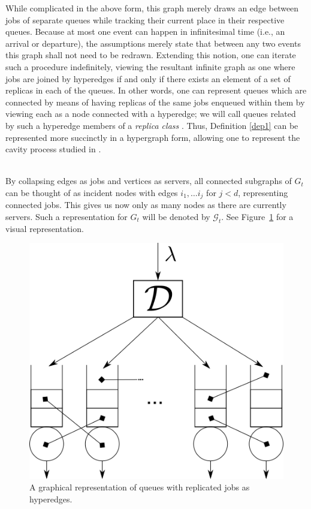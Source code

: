 While complicated in the above form, this graph merely draws an edge between jobs of separate queues while tracking their current place in their respective queues. Because at most one event can happen in infinitesimal time (i.e., an arrival or departure), the assumptions merely state that between any two events this graph shall not need to be redrawn. Extending this notion, one can iterate such a procedure indefinitely, viewing the resultant infinite graph as one where jobs are joined by hyperedges if and only if there exists an element of a set of replicas in each of the queues. In other words, one can represent queues which are connected by means of having replicas of the same jobs enqueued within them by viewing each as a node connected with a hyperedge; we will call queues related by such a hyperedge members of a \textit{replica class} . Thus, Definition \ref{dep1} can be represented more succinctly in a hypergraph form, allowing one to represent the cavity process studied in \cite{Hellemans}.

\begin{definition}
    \hfill \\
    By collapsing edges as jobs and vertices as servers, all connected subgraphs of $G_{t}$ can be thought of as incident nodes with edges $i_{1}, \dots i_{j}$ for $j<d$, representing connected jobs. This gives us now only as many nodes as there are currently servers. Such a representation for $G_{t}$ will be denoted by $\mathcal{G}_{t}$. See Figure~\ref{fig:hyper} for a visual representation.
\end{definition}

\begin{figure}
    \centering
    \includegraphics[scale=0.5]{systemredun}
    \caption{A graphical representation of queues with replicated jobs as hyperedges.}
    \label{fig:hyper}
\end{figure}

